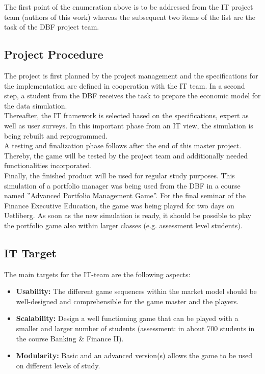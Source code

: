 The first point of the enumeration above is to be addressed from the IT project team (authors of this work) whereas the subsequent two items of the list are the task of the DBF project team.


\subsection{Project Procedure}

The project is first planned by the project management and the specifications for the implementation are defined in cooperation with the IT team. In a second step, a student from the DBF receives the task to prepare the economic model for the data simulation.\\

Thereafter, the IT framework is selected based on the specifications, expert as well as user surveys. In this important phase from an IT view, the simulation is being rebuilt and reprogrammed.\\

A testing and finalization phase follows after the end of this master project. Thereby, the game will be tested by the project team and additionally needed functionalities incorporated.\\

Finally, the finished product will be used for regular study purposes. This simulation of a portfolio manager was being used from the DBF in a course named ''Advanced Portfolio Management Game''. For the final seminar of the Finance Executive Education, the game was being played for two days on Uetliberg. As soon as the new simulation is ready, it should be possible to play the portfolio game also within larger classes (e.g. assessment level students).


\subsection{IT Target}
The main targets for the IT-team are the following aspects:
\begin{itemize}
  \item \textbf{Usability:} The different game sequences within the market model should be well-designed and comprehensible for the game master and the players.
  \item \textbf{Scalability:} Design a well functioning game that can be played with a smaller and larger number of students (assessment: in about 700 students in the course Banking \& Finance II).
  \item \textbf{Modularity:} Basic and an advanced version(s) allows the game to be used on different levels of study.
\end{itemize}

